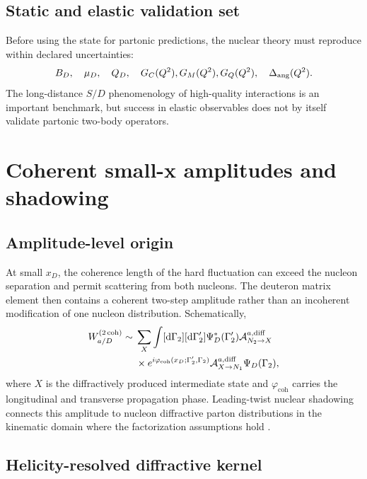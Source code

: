 \documentclass[11pt]{article}
\newcommand{\dd}{\mathrm{d}}
\newcommand{\cA}{\mathcal A}
\newcommand{\coh}{\mathrm{coh}}
\begin{document}
\subsection{Static and elastic validation set}

Before using the state for partonic predictions, the nuclear theory must
reproduce within declared uncertainties:
\begin{equation}
 B_D,
 \quad
 \mu_D,
 \quad
 Q_D,
 \quad
 G_C(Q^2),G_M(Q^2),G_Q(Q^2),
 \quad
 \Delta_{\rm ang}(Q^2).
\label{eq:elastic-validation-set}
\end{equation}
The long-distance \(S/D\) phenomenology of high-quality interactions is an
important benchmark, but success in elastic observables does not by itself
validate partonic two-body operators.

\section{Coherent small-x amplitudes and shadowing}
\label{sec:coherent-shadowing}

\subsection{Amplitude-level origin}

At small \(x_D\), the coherence length of the hard fluctuation can exceed the
nucleon separation and permit scattering from both nucleons.  The deuteron
matrix element then contains a coherent two-step amplitude rather than an
incoherent modification of one nucleon distribution.  Schematically,
\begin{align}
 W_{a/D}^{(2\,\coh)}
 \sim{}&
 \sum_{X}
 \int[\dd\Gamma_2][\dd\Gamma_2']
 \Psi_D^*(\Gamma_2')
 \cA_{N_2\to X}^{a,\rm diff}
 \notag\\
 &\times
 e^{i\varphi_{\coh}(x_D;\Gamma_2',\Gamma_2)}
 \cA_{X\to N_1}^{a,\rm diff}
 \Psi_D(\Gamma_2),
\label{eq:coherent-double-scattering}
\end{align}
where \(X\) is the diffractively produced intermediate state and
\(\varphi_{\coh}\) carries the longitudinal and transverse propagation
phase.  Leading-twist nuclear shadowing connects this amplitude to nucleon
diffractive parton distributions in the kinematic domain where the
factorization assumptions hold \cite{FrankfurtGuzeyStrikman2012}.

\subsection{Helicity-resolved diffractive kernel}
\end{document}
